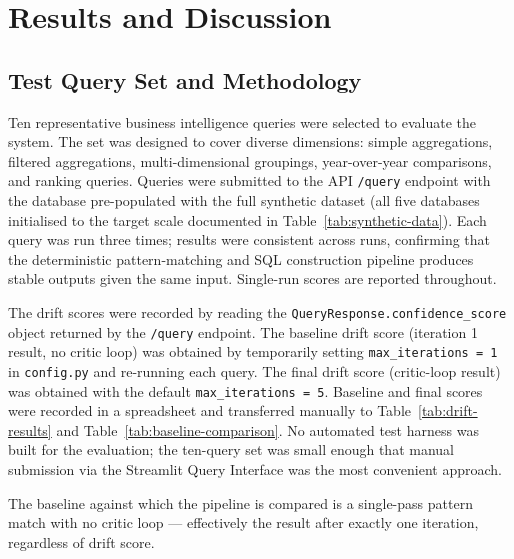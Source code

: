 \documentclass[12pt,a4paper]{report}
\begin{document}
\chapter{Results and Discussion}
\label{ch:results}

\section{Test Query Set and Methodology}
\label{sec:test-methodology}

Ten representative business intelligence queries were selected to evaluate the system. The set was designed to cover diverse dimensions: simple aggregations, filtered aggregations, multi-dimensional groupings, year-over-year comparisons, and ranking queries. Queries were submitted to the \ac{API} \texttt{/query} endpoint with the database pre-populated with the full synthetic dataset (all five databases initialised to the target scale documented in Table~\ref{tab:synthetic-data}). Each query was run three times; results were consistent across runs, confirming that the deterministic pattern-matching and SQL construction pipeline produces stable outputs given the same input. Single-run scores are reported throughout.

The drift scores were recorded by reading the \texttt{QueryResponse.confidence\_score} object returned by the \texttt{/query} endpoint. The baseline drift score (iteration 1 result, no critic loop) was obtained by temporarily setting \texttt{max\_iterations = 1} in \texttt{config.py} and re-running each query. The final drift score (critic-loop result) was obtained with the default \texttt{max\_iterations = 5}. Baseline and final scores were recorded in a spreadsheet and transferred manually to Table~\ref{tab:drift-results} and Table~\ref{tab:baseline-comparison}. No automated test harness was built for the evaluation; the ten-query set was small enough that manual submission via the Streamlit Query Interface was the most convenient approach.

The baseline against which the pipeline is compared is a single-pass pattern match with no critic loop — effectively the result after exactly one iteration, regardless of drift score.
\end{document}
